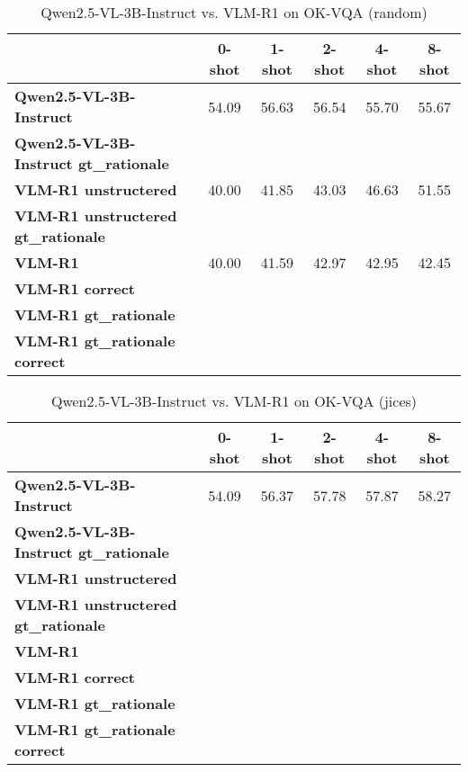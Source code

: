 \begin{table}
\caption{Qwen2.5-VL-3B-Instruct vs. VLM-R1 on OK-VQA (random)}
\label{tab:Qwen2.5-VL-3B-Instruct_OK-VQA_TRAIN_random}
\begin{tabular}{lccccc}
\toprule
 & 0-shot & 1-shot & 2-shot & 4-shot & 8-shot \\
\midrule
\textbf{Qwen2.5-VL-3B-Instruct} & 54.09 & 56.63 & 56.54 & 55.70 & 55.67 \\
\textbf{Qwen2.5-VL-3B-Instruct gt\_rationale} &  &  &  &  &  \\
\textbf{VLM-R1 unstructered} & 40.00 & 41.85 & 43.03 & 46.63 & 51.55 \\
\textbf{VLM-R1 unstructered gt\_rationale} &  &  &  &  &  \\
\textbf{VLM-R1} & 40.00 & 41.59 & 42.97 & 42.95 & 42.45 \\
\textbf{VLM-R1 correct} &  &  &  &  &  \\
\textbf{VLM-R1 gt\_rationale} &  &  &  &  &  \\
\textbf{VLM-R1 gt\_rationale correct} &  &  &  &  &  \\
\bottomrule
\end{tabular}
\end{table}


\begin{table}
\caption{Qwen2.5-VL-3B-Instruct vs. VLM-R1 on OK-VQA (jices)}
\label{tab:Qwen2.5-VL-3B-Instruct_OK-VQA_TRAIN_jices}
\begin{tabular}{lccccc}
\toprule
 & 0-shot & 1-shot & 2-shot & 4-shot & 8-shot \\
\midrule
\textbf{Qwen2.5-VL-3B-Instruct} & 54.09 & 56.37 & 57.78 & 57.87 & 58.27 \\
\textbf{Qwen2.5-VL-3B-Instruct gt\_rationale} &  &  &  &  &  \\
\textbf{VLM-R1 unstructered} &  &  &  &  &  \\
\textbf{VLM-R1 unstructered gt\_rationale} &  &  &  &  &  \\
\textbf{VLM-R1} &  &  &  &  &  \\
\textbf{VLM-R1 correct} &  &  &  &  &  \\
\textbf{VLM-R1 gt\_rationale} &  &  &  &  &  \\
\textbf{VLM-R1 gt\_rationale correct} &  &  &  &  &  \\
\bottomrule
\end{tabular}
\end{table}



